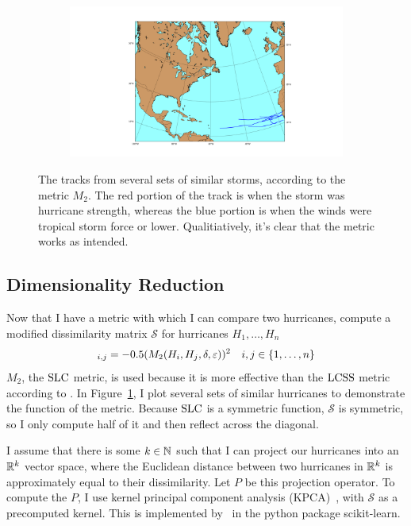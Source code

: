 \begin{figure}
\begin{subfigure}[t]{0.45\textwidth}
	\end{subfigure}
	\begin{subfigure}[t]{0.45\textwidth}
		\centering
		\includegraphics[width=\linewidth, trim=350 50 300 50, clip]{images/similar_hurricanes_4.png}
	\end{subfigure}
	\caption{The tracks from several sets of similar storms, according to the metric $M_{2}$. The red portion of the track is when the storm was hurricane strength, whereas the blue portion is when the winds were tropical storm force or lower. Qualitiatively, it's clear that the metric works as intended.}
	\label{fig:similar_hurricanes}
\end{figure}

\subsection{Dimensionality Reduction}

\par
Now that I have a metric with which I can compare two hurricanes, compute a modified dissimilarity matrix $\mathcal{S}$ for hurricanes $H_{1},\ldots,H_{n}$
\begin{equation*}
	[\mathcal{S}]_{i,j}=-0.5(M_{2}(H_{i},H_{j},\delta,\varepsilon))^{2}\quad{}i,j\in\set{1,\ldots,n}
	\label{eq:dissimilarity}
\end{equation*}
$M_{2}$, the $\operatorname{SLC}$ metric, is used because it is more effective than the $\operatorname{LCSS}$ metric according to \cite{ho2015manifold}.
In Figure~\ref{fig:similar_hurricanes}, I plot several sets of similar hurricanes to demonstrate the function of the metric.
Because $\operatorname{SLC}$ is a symmetric function, $\mathcal{S}$ is symmetric, so I only compute half of it and then reflect across the diagonal.

\par
I assume that there is some $k\in\mathbb{N}$ such that I can project our hurricanes into an $\mathbb{R}^{k}$ vector space, where the Euclidean distance between two hurricanes in $\mathbb{R}^{k}$ is approximately equal to their dissimilarity.
Let $P$ be this projection operator.
To compute the $P$, I use kernel principal component analysis (KPCA)~\cite{scholkopf1997kernel}, with $\mathcal{S}$ as a precomputed kernel.
This is implemented by~\cite{scikit-learn} in the python package scikit-learn.

